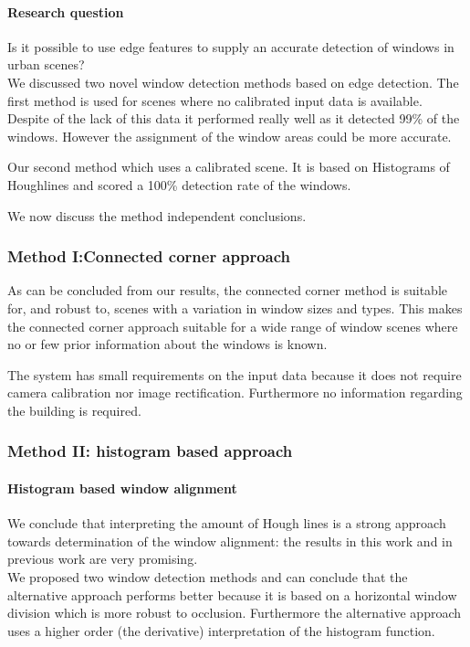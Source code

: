 \paragraph{Research question}
Is it possible to use edge features to supply an accurate detection of windows in
urban scenes?\\

We discussed two novel window detection methods based on edge detection. The
first method is used for scenes where no calibrated input data is available.
Despite of the lack of this data it performed really well as it detected 99\% of
the windows. However the assignment of the window areas could be more accurate.  

Our second method which uses a calibrated scene.  It is based on Histograms
of Houghlines and scored a 100\% detection rate of the windows.  

We now discuss the method independent conclusions.  

\subsubsection{Method I:Connected corner approach} %
As can be concluded from our results, the connected corner method is suitable
for, and robust to, scenes with a variation in window sizes and types. This
	makes the connected corner approach suitable for a wide range of window
	scenes where no or few prior information about the windows is known.

The system has small requirements on the input data because it does not require
camera calibration nor image rectification.  Furthermore no information
regarding the building is required.


\subsubsection{Method II: histogram based approach}
\paragraph{Histogram based window alignment}
We conclude that interpreting the amount of Hough lines is a strong approach
towards determination of the window alignment: the
results in this work and in previous work are very promising.\\

We proposed two window detection methods and can conclude that the alternative
approach performs better because it is based on a horizontal window division
which is more robust to occlusion. Furthermore the alternative approach uses a
higher order (the derivative) interpretation of the histogram function.\\

